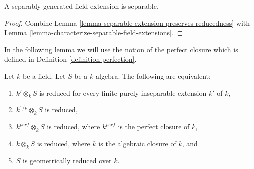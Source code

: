 \begin{lemma}
\label{lemma-separably-generated-separable}
A separably generated field extension is separable.
\end{lemma}

\begin{proof}
Combine Lemma \ref{lemma-separable-extension-preserves-reducedness}
with Lemma \ref{lemma-characterize-separable-field-extensions}.
\end{proof}

\noindent
In the following lemma we will use the notion of the perfect closure
which is defined in
Definition \ref{definition-perfection}.

\begin{lemma}
\label{lemma-geometrically-reduced-finite-purely-inseparable-extension}
Let $k$ be a field. Let $S$ be a $k$-algebra.
The following are equivalent:
\begin{enumerate}
\item $k' \otimes_k S$ is reduced for every finite
purely inseparable extension $k'$ of $k$,
\item $k^{1/p} \otimes_k S$ is reduced,
\item $k^{perf} \otimes_k S$ is reduced, where $k^{perf}$ is the
perfect closure of $k$,
\item $\overline{k} \otimes_k S$ is reduced, where $\overline{k}$ is the
algebraic closure of $k$, and
\item $S$ is geometrically reduced over $k$.
\end{enumerate}
\end{lemma}

